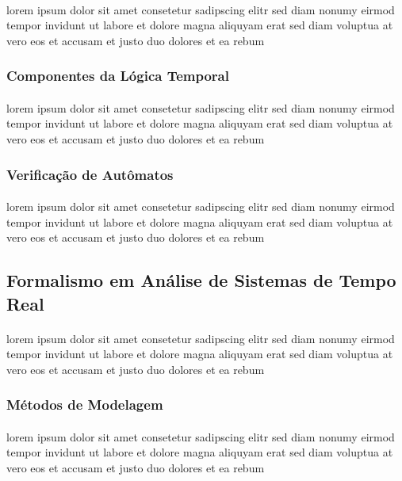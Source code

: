 \paragraph{}
lorem ipsum dolor sit amet consetetur sadipscing elitr sed diam nonumy
eirmod tempor invidunt ut labore et dolore magna aliquyam erat sed diam
voluptua at vero eos et accusam et justo duo dolores et ea rebum

\subsubsection{Componentes da Lógica Temporal}
\paragraph{}
lorem ipsum dolor sit amet consetetur sadipscing elitr sed diam nonumy
eirmod tempor invidunt ut labore et dolore magna aliquyam erat sed diam
voluptua at vero eos et accusam et justo duo dolores et ea rebum

\subsubsection{Verificação de Autômatos}
\paragraph{}
lorem ipsum dolor sit amet consetetur sadipscing elitr sed diam nonumy
eirmod tempor invidunt ut labore et dolore magna aliquyam erat sed diam
voluptua at vero eos et accusam et justo duo dolores et ea rebum

\subsection{Formalismo em Análise de Sistemas de Tempo Real}
\paragraph{}
lorem ipsum dolor sit amet consetetur sadipscing elitr sed diam nonumy
eirmod tempor invidunt ut labore et dolore magna aliquyam erat sed diam
voluptua at vero eos et accusam et justo duo dolores et ea rebum

\subsubsection{Métodos de Modelagem}
\paragraph{}
lorem ipsum dolor sit amet consetetur sadipscing elitr sed diam nonumy
eirmod tempor invidunt ut labore et dolore magna aliquyam erat sed diam
voluptua at vero eos et accusam et justo duo dolores et ea rebum


